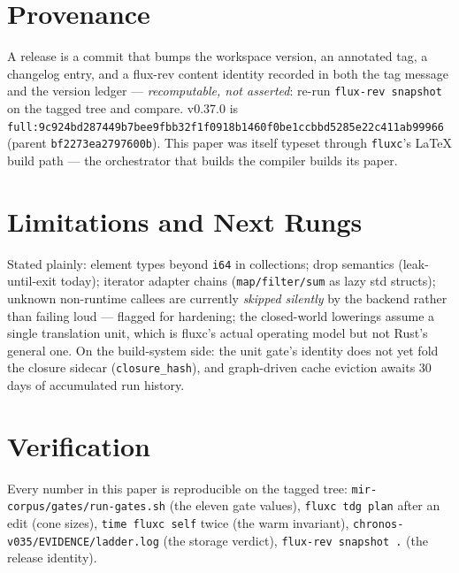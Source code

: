 \documentclass[11pt]{article}
\begin{document}
\section{Provenance}
A release is a commit that bumps the workspace version, an annotated tag, a
changelog entry, and a flux-rev content identity recorded in both the tag
message and the version ledger --- \emph{recomputable, not asserted}: re-run
\texttt{flux-rev snapshot} on the tagged tree and compare. v0.37.0 is
\texttt{full:9c924bd287449b7bee9fbb32f1f0918b1460f0be1ccbbd5285e22c411ab99966}
(parent \texttt{bf2273ea2797600b}). This paper was itself typeset through
\texttt{fluxc}'s LaTeX build path --- the orchestrator that builds the
compiler builds its paper.

\section{Limitations and Next Rungs}
Stated plainly: element types beyond \texttt{i64} in collections; drop
semantics (leak-until-exit today); iterator adapter chains
(\texttt{map/filter/sum} as lazy std structs); unknown non-runtime callees are
currently \emph{skipped silently} by the backend rather than failing loud ---
flagged for hardening; the closed-world lowerings assume a single translation
unit, which is fluxc's actual operating model but not Rust's general one.
On the build-system side: the unit gate's identity does not yet fold the
closure sidecar (\texttt{closure\_hash}), and graph-driven cache eviction
awaits 30 days of accumulated run history.

\section*{Verification}
Every number in this paper is reproducible on the tagged tree:
\texttt{mir-corpus/gates/run-gates.sh} (the eleven gate values),
\texttt{fluxc tdg plan} after an edit (cone sizes),
\texttt{time fluxc self} twice (the warm invariant),
\texttt{chronos-v035/EVIDENCE/ladder.log} (the storage verdict),
\texttt{flux-rev snapshot .} (the release identity).
\end{document}
